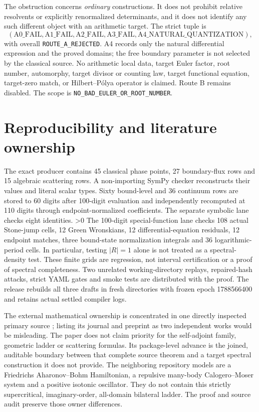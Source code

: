 \documentclass[10pt]{article}
\begin{document}
\begin{samepage}
The obstruction concerns \emph{ordinary} constructions. It does not prohibit
relative resolvents or explicitly renormalized determinants, and it does not
identify any such different object with an arithmetic target.
The strict tuple is
\[
 (\mathrm{A0\_FAIL},\mathrm{A1\_FAIL},\mathrm{A2\_FAIL},
   \mathrm{A3\_FAIL},\mathrm{A4\_NATURAL\_QUANTIZATION}),
\]
with overall \texttt{ROUTE\_A\_REJECTED}.
A4 records only the natural differential expression and the proved domains;
the free boundary parameter is not selected by the classical source.
No arithmetic local data, target Euler factor, root number, automorphy,
target divisor or counting law, target functional equation, target-zero match,
or Hilbert--Pólya operator is claimed. Route B remains disabled.
The scope is \texttt{NO\_BAD\_EULER\_OR\_ROOT\_NUMBER}.
\end{samepage}
\fi

\section{Reproducibility and literature ownership}
The exact producer contains 45 classical phase points, 27 boundary-flux rows
and 15 algebraic scattering rows. A non-importing SymPy checker reconstructs
their values and literal scalar types. Sixty bound-level and 36 continuum
rows are stored to 60 digits after 100-digit evaluation and independently
recomputed at 110 digits through endpoint-normalized coefficients.
The separate symbolic lane checks eight identities.
\ifnum\CRevisionRound>0
The 100-digit special-function lane checks 108 actual Stone-jump cells,
12 Green Wronskians, 12 differential-equation residuals, 12 endpoint matches,
three bound-state normalization integrals and 36 logarithmic-period cells.
In particular, testing $|R|=1$ alone is not treated as a spectral-density test.
\fi
These finite grids are regression, not interval certification or a proof of
spectral completeness. Two unrelated working-directory replays, repaired-hash
attacks, strict YAML gates and smoke tests are distributed with the proof.
The release rebuilds all three drafts in fresh directories with frozen epoch
1788566400 and retains actual settled compiler logs.

The external mathematical ownership is concentrated in one directly
inspected primary source \cite{dr2017}; listing its journal and preprint as
two independent works would be misleading. The paper does not claim priority
for the self-adjoint family, geometric ladder or scattering formulas.
Its package-level advance is the joined, auditable boundary between that
complete source theorem and a target spectral construction it does not provide.
The neighboring repository models are a Friedrichs Aharonov--Bohm Hamiltonian,
a repulsive many-body Calogero--Moser system and a positive isotonic oscillator.
They do not contain this strictly supercritical, imaginary-order, all-domain
bilateral ladder. The proof and source audit preserve those owner differences.
\end{document}

